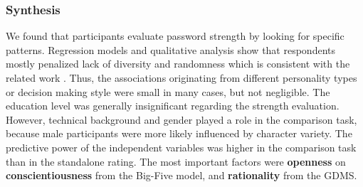 \subsubsection{Synthesis}
We found that participants evaluate password strength by looking for specific patterns. Regression models and qualitative analysis show that respondents mostly penalized lack of diversity and randomness which is consistent with the related work \cite{Ur2016PerceptionsPassword}. Thus, the associations originating from different personality types or decision making style were small in many cases, but not negligible. The education level was generally insignificant regarding the strength evaluation. However, technical background and gender played a role in the comparison task, because male participants were more likely influenced by character variety. The predictive power of the independent variables was higher in the comparison task than in the standalone rating. The most important factors were \textbf{openness} on \textbf{conscientiousness} from the Big-Five model, and \textbf{rationality} from the GDMS. 